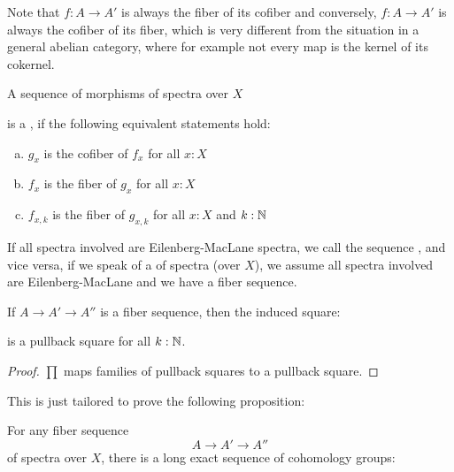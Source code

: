 Note that $f:A\to A'$ is always the fiber of its cofiber and conversely, $f:A\to A'$ is always the cofiber of its fiber, which is very different from the situation in a general abelian category,
where for example not every map is the kernel of its cokernel.

\begin{definition}
  A sequence of morphisms of spectra over $X$
  \begin{center}
  \end{center}
  is a , if the following equivalent statements hold:
  \begin{enumerate}[(a)]
  \item $g_x$ is the cofiber of $f_x$ for all $x:X$
  \item $f_x$ is the fiber of $g_x$ for all $x:X$
  \item $f_{x,k}$ is the fiber of $g_{x,k}$ for all $x:X$ and $k:\mathbb{N}$
  \end{enumerate}
  If all spectra involved are Eilenberg-MacLane spectra, we call the sequence , and vice versa,
  if we speak of a  of spectra (over $X$), we assume all spectra involved are Eilenberg-MacLane and we have a fiber sequence.
\end{definition}

\begin{lemma}
  If $A\to A'\to A''$ is a fiber sequence, then the induced square:
  \begin{center}
  \end{center}
  is a pullback square for all $k:\mathbb{N}$.
\end{lemma}
\begin{proof}
  $\prod$ maps families of pullback squares to a pullback square.
\end{proof}

This is just tailored to prove the following proposition:

\begin{proposition}
  For any fiber sequence
  \[ A\to A'\to A'' \]
  of spectra over $X$, there is a long exact sequence of cohomology groups:
  \begin{center}
  \end{center}
\end{proposition}

